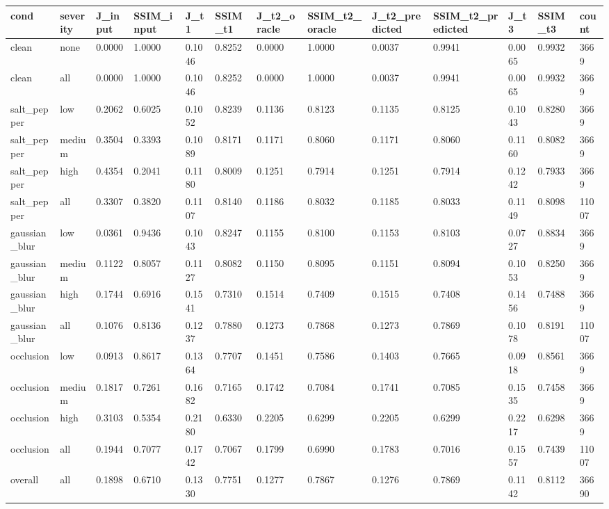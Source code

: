 \begin{tabular}{lllllllllllll}
\hline
cond & severity & J\_input & SSIM\_input & J\_t1 & SSIM\_t1 & J\_t2\_oracle & SSIM\_t2\_oracle & J\_t2\_predicted & SSIM\_t2\_predicted & J\_t3 & SSIM\_t3 & count \\
\hline
clean & none & 0.0000 & 1.0000 & 0.1046 & 0.8252 & 0.0000 & 1.0000 & 0.0037 & 0.9941 & 0.0065 & 0.9932 & 3669 \\
clean & all & 0.0000 & 1.0000 & 0.1046 & 0.8252 & 0.0000 & 1.0000 & 0.0037 & 0.9941 & 0.0065 & 0.9932 & 3669 \\
salt\_pepper & low & 0.2062 & 0.6025 & 0.1052 & 0.8239 & 0.1136 & 0.8123 & 0.1135 & 0.8125 & 0.1043 & 0.8280 & 3669 \\
salt\_pepper & medium & 0.3504 & 0.3393 & 0.1089 & 0.8171 & 0.1171 & 0.8060 & 0.1171 & 0.8060 & 0.1160 & 0.8082 & 3669 \\
salt\_pepper & high & 0.4354 & 0.2041 & 0.1180 & 0.8009 & 0.1251 & 0.7914 & 0.1251 & 0.7914 & 0.1242 & 0.7933 & 3669 \\
salt\_pepper & all & 0.3307 & 0.3820 & 0.1107 & 0.8140 & 0.1186 & 0.8032 & 0.1185 & 0.8033 & 0.1149 & 0.8098 & 11007 \\
gaussian\_blur & low & 0.0361 & 0.9436 & 0.1043 & 0.8247 & 0.1155 & 0.8100 & 0.1153 & 0.8103 & 0.0727 & 0.8834 & 3669 \\
gaussian\_blur & medium & 0.1122 & 0.8057 & 0.1127 & 0.8082 & 0.1150 & 0.8095 & 0.1151 & 0.8094 & 0.1053 & 0.8250 & 3669 \\
gaussian\_blur & high & 0.1744 & 0.6916 & 0.1541 & 0.7310 & 0.1514 & 0.7409 & 0.1515 & 0.7408 & 0.1456 & 0.7488 & 3669 \\
gaussian\_blur & all & 0.1076 & 0.8136 & 0.1237 & 0.7880 & 0.1273 & 0.7868 & 0.1273 & 0.7869 & 0.1078 & 0.8191 & 11007 \\
occlusion & low & 0.0913 & 0.8617 & 0.1364 & 0.7707 & 0.1451 & 0.7586 & 0.1403 & 0.7665 & 0.0918 & 0.8561 & 3669 \\
occlusion & medium & 0.1817 & 0.7261 & 0.1682 & 0.7165 & 0.1742 & 0.7084 & 0.1741 & 0.7085 & 0.1535 & 0.7458 & 3669 \\
occlusion & high & 0.3103 & 0.5354 & 0.2180 & 0.6330 & 0.2205 & 0.6299 & 0.2205 & 0.6299 & 0.2217 & 0.6298 & 3669 \\
occlusion & all & 0.1944 & 0.7077 & 0.1742 & 0.7067 & 0.1799 & 0.6990 & 0.1783 & 0.7016 & 0.1557 & 0.7439 & 11007 \\
overall & all & 0.1898 & 0.6710 & 0.1330 & 0.7751 & 0.1277 & 0.7867 & 0.1276 & 0.7869 & 0.1142 & 0.8112 & 36690 \\
\hline
\end{tabular}
